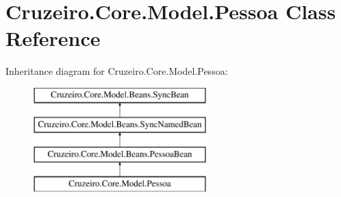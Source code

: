 \hypertarget{class_cruzeiro_1_1_core_1_1_model_1_1_pessoa}{}\section{Cruzeiro.\+Core.\+Model.\+Pessoa Class Reference}
\label{class_cruzeiro_1_1_core_1_1_model_1_1_pessoa}
Inheritance diagram for Cruzeiro.\+Core.\+Model.\+Pessoa\+:\begin{figure}[H]
\begin{center}
\leavevmode
\includegraphics[height=4.000000cm]{class_cruzeiro_1_1_core_1_1_model_1_1_pessoa}
\end{center}
\end{figure}
